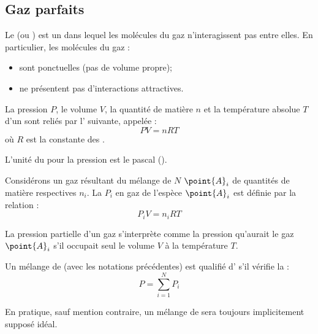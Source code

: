 \subsection{Gaz parfaits}

\begin{definition}
Le  (ou ) est un  dans lequel les molécules du gaz n'interagissent pas entre elles. En particulier, les molécules du gaz :
\begin{itemize}
\item sont ponctuelles (pas de volume propre);
\item ne présentent pas d'interactions attractives.
\end{itemize}
\end{definition}

\begin{propriete}[admis]
La pression $P$, le volume $V$, la quantité de matière $n$ et la température absolue $T$ d'un  sont reliés par l' suivante, appelée  :
\[PV = nRT\]
où $R$ est la constante des .
\end{propriete}

\begin{remarque}
L'unité du  pour la pression est le pascal (\pascal).
\end{remarque}

\begin{definition}
Considérons un gaz résultant du mélange de $N$  $\point{A}_i$ de quantités de matière respectives $n_i$. La  $P_i$ en gaz de l'espèce $\point{A}_i$ est définie par la relation :
\[P_i V = n_i RT\]
\end{definition}

\begin{remarque}
La pression partielle d'un gaz s'interprète comme la pression qu'aurait le gaz $\point{A}_i$ s'il occupait seul le volume $V$ à la température $T$.
\end{remarque}

\begin{definition}
Un mélange de  (avec les notations précédentes) est qualifié d' s'il vérifie la  :
\[P = \sum_{i = 1}^N P_i\]
\end{definition}

\begin{remarque}
En pratique, sauf mention contraire, un mélange de  sera toujours implicitement supposé idéal.
\end{remarque}

